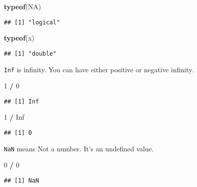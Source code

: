 \documentclass[
]{book}
\newenvironment{Shaded}{\begin{snugshade}}{\end{snugshade}}
\newcommand{\DecValTok}[1]{\textcolor[rgb]{0.00,0.00,0.81}{#1}}
\newcommand{\KeywordTok}[1]{\textcolor[rgb]{0.13,0.29,0.53}{\textbf{#1}}}
\newcommand{\NormalTok}[1]{#1}
\newcommand{\OperatorTok}[1]{\textcolor[rgb]{0.81,0.36,0.00}{\textbf{#1}}}
\newcommand{\OtherTok}[1]{\textcolor[rgb]{0.56,0.35,0.01}{#1}}
\newcommand{\StringTok}[1]{\textcolor[rgb]{0.31,0.60,0.02}{#1}}
\begin{document}
\begin{Shaded}
\begin{Highlighting}[]
\KeywordTok{typeof}\NormalTok{(}\OtherTok{NA}\NormalTok{)}
\end{Highlighting}
\end{Shaded}

\begin{verbatim}
## [1] "logical"
\end{verbatim}

\begin{Shaded}
\begin{Highlighting}[]
\KeywordTok{typeof}\NormalTok{(x)}
\end{Highlighting}
\end{Shaded}

\begin{verbatim}
## [1] "double"
\end{verbatim}

\texttt{Inf} is infinity. You can have either positive or negative infinity.

\begin{Shaded}
\begin{Highlighting}[]
\DecValTok{1} \OperatorTok{/}\StringTok{ }\DecValTok{0}
\end{Highlighting}
\end{Shaded}

\begin{verbatim}
## [1] Inf
\end{verbatim}

\begin{Shaded}
\begin{Highlighting}[]
\DecValTok{1} \OperatorTok{/}\StringTok{ }\OtherTok{Inf}
\end{Highlighting}
\end{Shaded}

\begin{verbatim}
## [1] 0
\end{verbatim}

\texttt{NaN} means Not a number. It's an undefined value.

\begin{Shaded}
\begin{Highlighting}[]
\DecValTok{0} \OperatorTok{/}\StringTok{ }\DecValTok{0}
\end{Highlighting}
\end{Shaded}

\begin{verbatim}
## [1] NaN
\end{verbatim}
\end{document}
